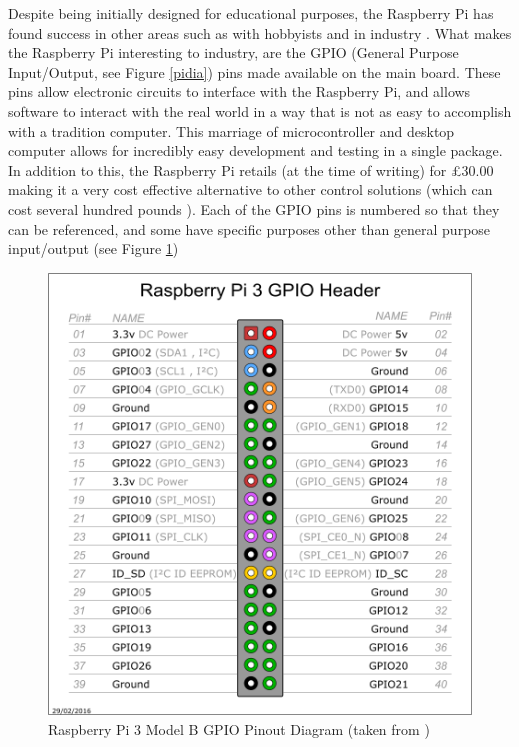 \documentclass{report}
\begin{document}
	Despite being initially designed for educational purposes, the Raspberry Pi has found success in other areas such as with hobbyists \cite{pihobbynotedu} and in industry \cite{pimorethanedu}.\newline \newline  \noindent
	What makes the Raspberry Pi interesting to industry, are the GPIO (General Purpose Input/Output, see Figure \ref{pidia}) pins made available on the main board. These pins allow electronic circuits to interface with the Raspberry Pi, and allows software to interact with the real world in a way that is not as easy to accomplish with a tradition computer. This marriage of microcontroller and desktop computer allows for incredibly easy development and testing in a single package. In addition to this, the Raspberry Pi retails (at the time of writing) for £30.00 \cite{picost} making it a very cost effective alternative to other control solutions (which can cost several hundred pounds \cite{otherpcucost}). Each of the GPIO pins is numbered so that they can be referenced, and some have specific purposes other than general purpose input/output (see Figure \ref{gpiopinout})\newline
	\begin{figure}[!h]
	\centering
	\includegraphics[scale=0.2]{images/gpiopinout.png}
	\caption{Raspberry Pi 3 Model B GPIO Pinout Diagram (taken from  \cite{pigpiopinout})}
	\label{gpiopinout}
	\end{figure} \newline  \noindent
\end{document}
